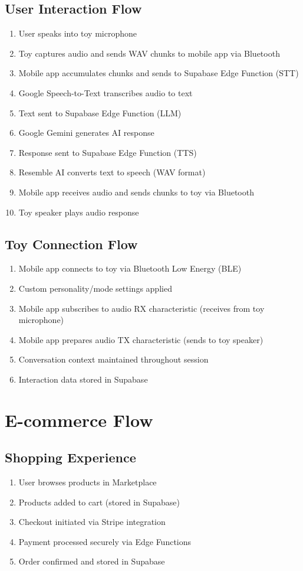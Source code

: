 \documentclass[11pt,a4paper]{article}
\begin{document}
\subsection{User Interaction Flow}
\begin{enumerate}
    \item User speaks into toy microphone
    \item Toy captures audio and sends WAV chunks to mobile app via Bluetooth
    \item Mobile app accumulates chunks and sends to Supabase Edge Function (STT)
    \item Google Speech-to-Text transcribes audio to text
    \item Text sent to Supabase Edge Function (LLM)
    \item Google Gemini generates AI response
    \item Response sent to Supabase Edge Function (TTS)
    \item Resemble AI converts text to speech (WAV format)
    \item Mobile app receives audio and sends chunks to toy via Bluetooth
    \item Toy speaker plays audio response
\end{enumerate}

\subsection{Toy Connection Flow}
\begin{enumerate}
    \item Mobile app connects to toy via Bluetooth Low Energy (BLE)
    \item Custom personality/mode settings applied
    \item Mobile app subscribes to audio RX characteristic (receives from toy microphone)
    \item Mobile app prepares audio TX characteristic (sends to toy speaker)
    \item Conversation context maintained throughout session
    \item Interaction data stored in Supabase
\end{enumerate}

\section{E-commerce Flow}

\subsection{Shopping Experience}
\begin{enumerate}
    \item User browses products in Marketplace
    \item Products added to cart (stored in Supabase)
    \item Checkout initiated via Stripe integration
    \item Payment processed securely via Edge Functions
    \item Order confirmed and stored in Supabase
\end{enumerate}
\end{document}
